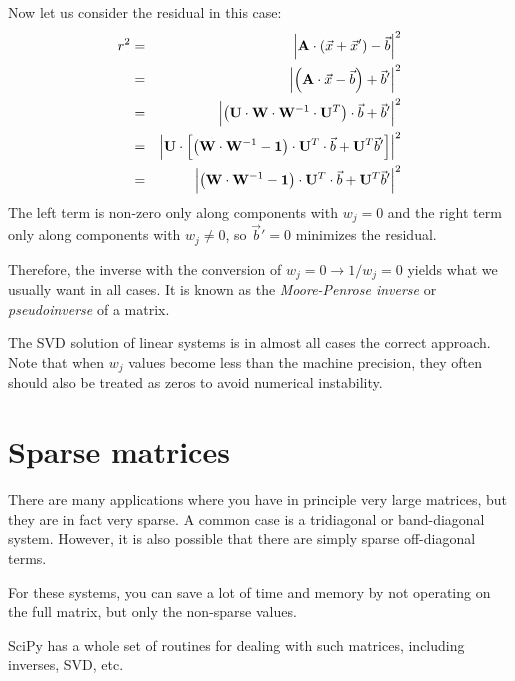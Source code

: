 Now let us consider the residual in this case:
\begin{eqnarray}
r^2 &=& \left|{\bf A}\cdot\left(\vec{x}
+ \vec{x}'\right)- \vec{b}\right|^2 \cr
 &=& \left|\left({\bf A}\cdot\vec{x} - \vec{b}\right)
+ \vec{b}'\right|^2 \cr
 &=& \left|\left({\bf U}\cdot{\bf W}\cdot{\bf W}^{-1}\cdot{\bf U}^T\right)\cdot\vec{b}
+ \vec{b}'\right|^2 \cr
 &=& \left|{\bf U}\cdot\left[\left({\bf W}\cdot{\bf W}^{-1}
 - {\bf 1}\right)\cdot{\bf U}^T\cdot\vec{b}
+ {\bf U}^T\vec{b}'\right]\right|^2 \cr
 &=& \left|\left({\bf W}\cdot{\bf W}^{-1}
 - {\bf 1}\right)\cdot{\bf U}^T\cdot\vec{b}
+ {\bf U}^T\vec{b}'\right|^2
\end{eqnarray}
The left term is non-zero only along components with $w_j=0$ and the
right term only along components with $w_j\ne 0$, so $\vec{b}'=0$
minimizes the residual.

Therefore, the inverse with the conversion of $w_j = 0\rightarrow
1/w_j = 0$ yields what we usually want in all cases. It is known as
the {\it Moore-Penrose inverse} or {\it pseudoinverse} of a matrix. 

The SVD solution of linear systems is in almost all cases the correct
approach. Note that when $w_j$ values become less than the machine
precision, they often should also be treated as zeros to avoid
numerical instability.

\section{Sparse matrices}

There are many applications where you have in principle very large
matrices, but they are in fact very sparse. A common case is a
tridiagonal or band-diagonal system. However, it is also possible that
there are simply sparse off-diagonal terms. 

For these systems, you can save a lot of time and memory by not
operating on the full matrix, but only the non-sparse values.

SciPy has a whole set of routines for dealing with such matrices,
including inverses, SVD, etc. 

